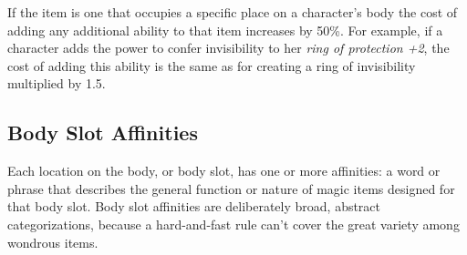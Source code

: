 If the item is one that occupies a specific place on a character's body the cost of adding any additional ability to that item increases by 50\%. For example, if a character adds the power to confer invisibility to her \emph{ring of protection +2}, the cost of adding this ability is the same as for creating a ring of invisibility multiplied by 1.5.

\subsection{Body Slot Affinities}
Each location on the body, or body slot, has one or more affinities: a word or phrase that describes the general function or nature of magic items designed for that body slot. Body slot affinities are deliberately broad, abstract categorizations, because a hard-and-fast rule can't cover the great variety among wondrous items.


